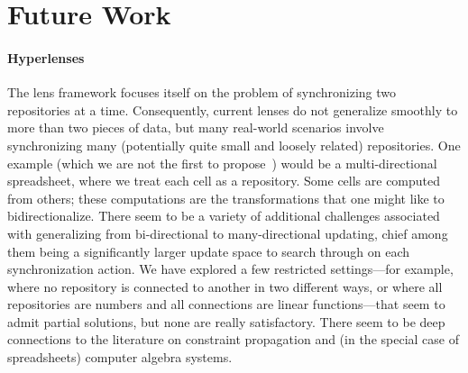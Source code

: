 \section{Future Work}
\label{sec:future}

\paragraph*{Hyperlenses}
The lens framework focuses itself on the problem of synchronizing two
repositories at a time. Consequently, current lenses do not generalize
smoothly to more than two pieces of data, but many real-world scenarios
involve synchronizing many (potentially quite small and loosely related)
repositories. One example (which we are not the first to
propose~\cite{macedotowards}) would be a multi-directional spreadsheet,
where we treat each cell as a repository. Some cells are computed from
others; these computations are the transformations that one might like to
bidirectionalize. There seem to be a variety of additional challenges
associated with generalizing from bi-directional to many-directional
updating, chief among them being a significantly larger update space to
search through on each synchronization action. We have explored a few
restricted settings---for example, where no repository is connected to
another in two different ways, or where all repositories are numbers and all
connections are linear functions---that seem to admit partial solutions, but
none are really satisfactory. There seem to be deep connections to the
literature on constraint propagation and (in the special case of
spreadsheets) computer algebra systems.


